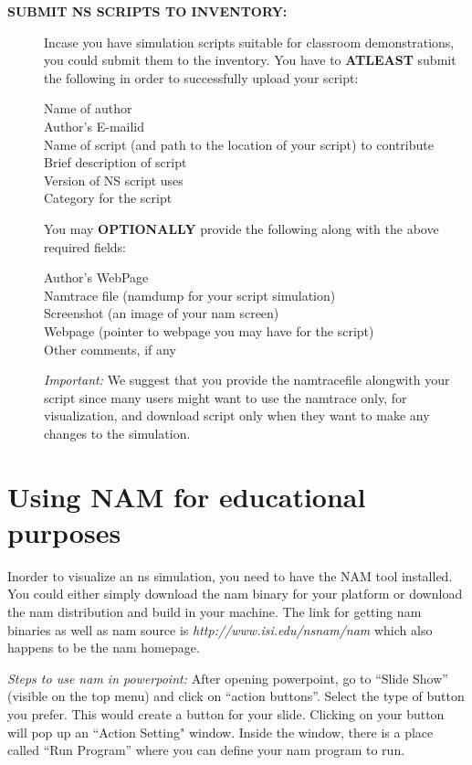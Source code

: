 \begin{description}
\item[{\bf SUBMIT NS SCRIPTS TO INVENTORY:}]
Incase you have simulation scripts suitable for classroom demonstrations, you could submit them to the inventory. You have to {\bf ATLEAST} submit the following in order to successfully upload your script:
\begin{description}
\item[{Name of author}]
\item[{Author's E-mailid}]
\item[{Name of script (and path to the location of your script) to contribute}]
\item[{Brief description of script}]
\item[{Version of NS script uses}]
\item[{Category for the script}]
\end{description}


You may {\bf OPTIONALLY} provide the following along with the above required fields:
\begin{description}
\item[{Author's WebPage}]
\item[{Namtrace file (namdump for your script simulation)}]
\item[{Screenshot (an image of your nam screen)}]
\item[{Webpage (pointer to webpage you may have for the script)}]
\item[{Other comments, if any}]
\end{description}

{\em Important:} We suggest that you provide the namtracefile alongwith your script since many users might want to use the namtrace only, for visualization, and download script only when they want to make any changes to the simulation.
\end{description}


\section{Using NAM for educational purposes}
\label{sec:nam-for-edu}
Inorder to visualize an ns simulation, you need to have the NAM tool installed. You could either simply download the nam binary for your platform or download the nam distribution and build in your machine. The link for getting nam binaries as well as nam source is {\em http://www.isi.edu/nsnam/nam} which also happens to be the nam homepage.

{\em Steps to use nam in powerpoint:}
After opening powerpoint, go to ``Slide Show'' (visible on the top menu) and click on ``action buttons''. Select the type of button you prefer. This would create a button for your slide. Clicking on your button will pop up an ``Action Setting" window. Inside the window, there is a place called ``Run Program'' where you
can define your nam program to run.



\endinput
